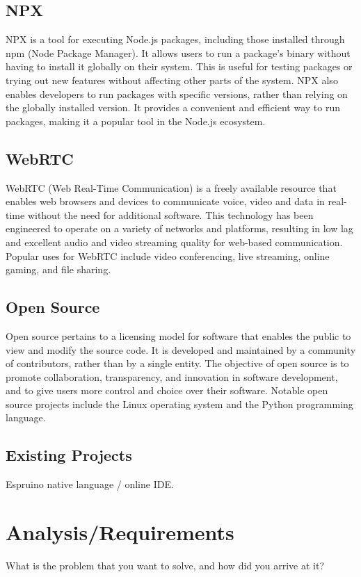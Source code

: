 \documentclass{l4proj}
\begin{document}
\section{NPX}
\text NPX is a tool for executing Node.js packages, including those installed through npm (Node Package Manager). It allows users to run a package's binary without having to install it globally on their system. This is useful for testing packages or trying out new features without affecting other parts of the system. NPX also enables developers to run packages with specific versions, rather than relying on the globally installed version. It provides a convenient and efficient way to run packages, making it a popular tool in the Node.js ecosystem.

\section{WebRTC}
\text WebRTC (Web Real-Time Communication) is a freely available resource that enables web browsers and devices to communicate voice, video and data in real-time without the need for additional software. This technology has been engineered to operate on a variety of networks and platforms, resulting in low lag and excellent audio and video streaming quality for web-based communication. Popular uses for WebRTC include video conferencing, live streaming, online gaming, and file sharing.

\section{Open Source}
\text Open source pertains to a licensing model for software that enables the public to view and modify the source code. It is developed and maintained by a community of contributors, rather than by a single entity. The objective of open source is to promote collaboration, transparency, and innovation in software development, and to give users more control and choice over their software. Notable open source projects include the Linux operating system and the Python programming language.

\section{Existing Projects}
\text Espruino native language / online IDE.

\chapter{Analysis/Requirements}
What is the problem that you want to solve, and how did you arrive at it?
\end{document}
